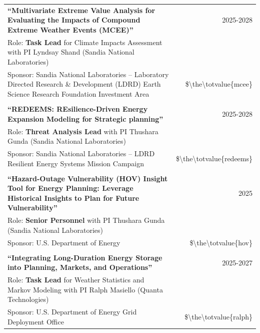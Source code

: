 \documentclass{article}[12pt]
\begin{document}
		\addtocounter{chem_facilities}{104000}
		\addtocounter{total_funding}{\value{chem_facilities}}
		
		\addtocounter{pv_pred_weather}{109000}
		\addtocounter{total_funding}{\value{pv_pred_weather}}
		\addtocounter{ndj_funding}{\value{pv_pred_weather}}
		
		\addtocounter{cinci}{250000}
		\addtocounter{total_funding}{\value{cinci}}
		
		\begin{tabularx}{\textwidth}{Xr}
			
			\textbf{``Multivariate Extreme Value Analysis for Evaluating the Impacts of Compound Extreme Weather Events (MCEE)''} & 2025-2028 \\
			Role: \textbf{Task Lead} for Climate Impacts Assessment with PI Lyndsay Shand (Sandia National Laboratories) & \\
			Sponsor: Sandia National Laboratories -- Laboratory Directed Research \& Development (LDRD) Earth Science Research Foundation Investment Area &  \$\num{\the\totvalue{mcee}} 
			\\
			\\
			\textbf{``REDEEMS: REsilience-Driven Energy Expansion Modeling for Strategic planning''} & 2025-2028 \\
			Role: \textbf{Threat Analysis Lead} with PI Thushara Gunda (Sandia National Laboratories) & \\
			Sponsor: Sandia National Laboratories -- LDRD Resilient Energy Systems Mission Campaign &  \$\num{\the\totvalue{redeems}} 
			\\
			\\
			\textbf{``Hazard-Outage Vulnerability (HOV) Insight Tool for Energy Planning: Leverage Historical Insights to Plan for Future Vulnerability''} & 2025 \\
			Role: \textbf{Senior Personnel} with PI Thushara Gunda (Sandia National Laboratories)& \\
			Sponsor: U.S. Department of Energy & \$\num{\the\totvalue{hov}}
			\\
			\\	
			\textbf{``Integrating Long-Duration Energy Storage into Planning, Markets, and Operations''} & 2025-2027 \\
			Role: \textbf{Task Lead} for Weather Statistics and Markov Modeling with PI Ralph Masiello (Quanta Technologies) & \\
			Sponsor: U.S. Department of Energy Grid Deployment Office & \$\num{\the\totvalue{ralph}} \\

\end{tabularx}
\end{document}
